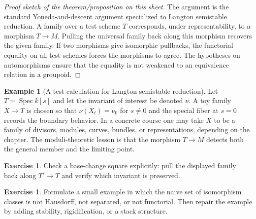 \documentclass[11pt]{amsart}
\theoremstyle{definition}
\newtheorem{example}[theorem]{Example}
\newtheorem{exercise}[theorem]{Exercise}
\newcommand{\Spec}{\operatorname{Spec}}
\begin{document}
\begin{proof}[Proof sketch of the theorem/proposition on this sheet]
The argument is the standard Yoneda-and-descent argument specialized to Langton semistable reduction.  A family over a test scheme $T$ corresponds, under representability, to a morphism $T\to M$.  Pulling the universal family back along this morphism recovers the given family.  If two morphisms give isomorphic pullbacks, the functorial equality on all test schemes forces the morphisms to agree.  The hypotheses on automorphisms ensure that the equality is not weakened to an equivalence relation in a groupoid.
\end{proof}
\begin{example}[A test calculation for Langton semistable reduction]
Let $T=\Spec k[s]$ and let the invariant of interest be denoted $\nu$.  A toy family $X\to T$ is chosen so that $\nu(X_t)=\nu_0$ for $s\ne0$ and the special fiber at $s=0$ records the boundary behavior.  In a concrete course one may take $X$ to be a family of divisors, modules, curves, bundles, or representations, depending on the chapter.  The moduli-theoretic lesson is that the morphism $T\to M$ detects both the general member and the limiting point.
\end{example}
\begin{exercise}
Check a base-change square explicitly: pull the displayed family back along $T\prime\to T$ and verify which invariant is preserved.
\end{exercise}
\begin{exercise}
Formulate a small example in which the naive set of isomorphism classes is not Hausdorff, not separated, or not functorial.  Then repair the example by adding stability, rigidification, or a stack structure.
\end{exercise}
\clearpage
\end{document}

